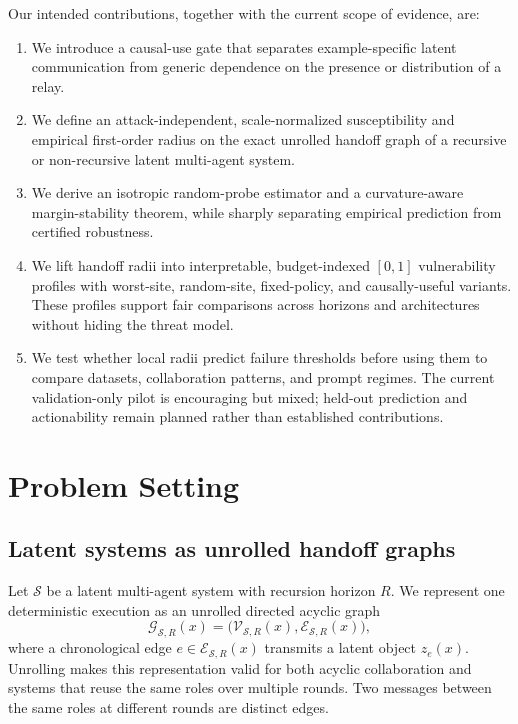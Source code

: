 \documentclass[11pt]{article}
\newcommand{\sys}{\mathcal S}
\begin{document}
Our intended contributions, together with the current scope of evidence, are:
\begin{enumerate}
    \item We introduce a causal-use gate that separates example-specific latent
    communication from generic dependence on the presence or distribution of a
    relay.
    \item We define an attack-independent, scale-normalized susceptibility and
    empirical first-order radius on the exact unrolled handoff graph of a
    recursive or non-recursive latent multi-agent system.
    \item We derive an isotropic random-probe estimator and a curvature-aware
    margin-stability theorem, while sharply separating empirical prediction
    from certified robustness.
    \item We lift handoff radii into interpretable, budget-indexed \([0,1]\)
    vulnerability profiles with worst-site, random-site, fixed-policy, and
    causally-useful variants. These profiles support fair comparisons across
    horizons and architectures without hiding the threat model.
    \item We test whether local radii predict failure thresholds before using
    them to compare datasets, collaboration patterns, and prompt regimes. The
    current validation-only pilot is encouraging but mixed; held-out prediction
    and actionability remain planned rather than established contributions.
\end{enumerate}

\section{Problem Setting}
\label{sec:problem-setting}

\subsection{Latent systems as unrolled handoff graphs}

Let \(\sys\) be a latent multi-agent system with recursion horizon \(R\). We
represent one deterministic execution as an unrolled directed acyclic graph
\begin{equation}
    \mathcal G_{\sys,R}(x)
    =\bigl(\mathcal V_{\sys,R}(x),\mathcal E_{\sys,R}(x)\bigr),
\end{equation}
where a chronological edge \(e\in\mathcal E_{\sys,R}(x)\) transmits a latent
object \(z_e(x)\). Unrolling makes this representation valid for both acyclic
collaboration and systems that reuse the same roles over multiple rounds. Two
messages between the same roles at different rounds are distinct edges.
\end{document}
